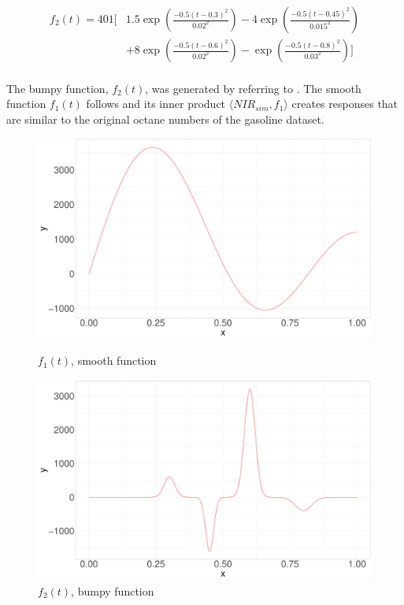 \documentclass[11pt,twoside,a4paper]{article}
\begin{document}
    \begin{equation}
    	\begin{split}
    		f_2(t) = 401  \Bigg[ & 1.5 \exp{\left(\frac{-0.5(t-0.3)^2}{0.02^2}\right)} - 4 \exp{\left(\frac{-0.5(t-0.45)^2}{0.015^2}\right)} \\
    				 & + 8 \exp{\left(\frac{-0.5(t-0.6)^2}{0.02^2}\right)} -  \exp{\left(\frac{-0.5(t-0.8)^2}{0.03^2}\right)} \Bigg]
    	\end{split}
    \end{equation}
    \vspace{0.2cm}\\
    
    The bumpy function, $f_2(t)$, was generated by referring to \cite{cardot_bumpyfunction_2002}. The smooth function $f_1(t)$ follows \cite{Reiss_2007b} and its inner product $\langle NIR_{sim}, f_1 \rangle$ creates responses that are similar to the original octane numbers of the gasoline dataset. 

		\vspace{0.1cm}
		\begin{figure}
			\centering
			\begin{minipage}{.5\textwidth}
				\centering
  				\includegraphics[width=\textwidth]{../Graphics/f1_plot.pdf}
  				\caption{$f_1(t)$, smooth function}
  				\label{fig:test1}
			\end{minipage}%
			\begin{minipage}{.5\textwidth}
	  			\centering
  				\includegraphics[width=\textwidth]{../Graphics/f2_plot.pdf}
  				\caption{$f_2(t)$, bumpy function}
  				\label{fig:test2}
			\end{minipage}
		\end{figure}
		
\end{document}
